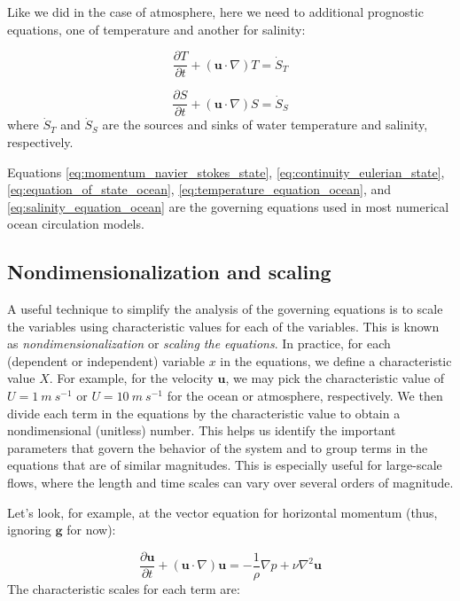\documentclass[12pt]{article}
\numberwithin{equation}{section}
\numberwithin{figure}{section}
\numberwithin{table}{section}
\begin{document}
Like we did in the case of atmosphere, here we need to additional prognostic
equations, one of temperature and another for salinity:

\begin{equation}
  \frac{\partial T}{\partial t} + (\mathbf{u} \cdot \nabla) T = \dot{S}_T
  \label{eq:temperature_equation_ocean}
\end{equation}

\begin{equation}
  \frac{\partial S}{\partial t} + (\mathbf{u} \cdot \nabla) S = \dot{S}_S
  \label{eq:salinity_equation_ocean}
\end{equation}
where $\dot{S}_T$ and $\dot{S}_S$ are the sources and sinks of water temperature
and salinity, respectively.

Equations \ref{eq:momentum_navier_stokes_state},
\ref{eq:continuity_eulerian_state},
\ref{eq:equation_of_state_ocean},
\ref{eq:temperature_equation_ocean}, and
\ref{eq:salinity_equation_ocean} are the governing equations used in most
numerical ocean circulation models.

\subsection{Nondimensionalization and scaling}
\label{sec:nondimensionalization_and_scaling}

A useful technique to simplify the analysis of the governing equations is to
scale the variables using characteristic values for each of the variables.
This is known as \textit{nondimensionalization}
or \textit{scaling the equations}.
In practice, for each (dependent or independent) variable $x$ in the equations,
we define a characteristic value $X$.
For example, for the velocity $\mathbf{u}$, we may pick the characteristic
value of $U = 1\ m\ s^{-1}$ or $U = 10\ m\ s^{-1}$ for the ocean or atmosphere,
respectively.
We then divide each term in the equations by the characteristic value to
obtain a nondimensional (unitless) number.
This helps us identify the important parameters that govern the behavior of
the system and to group terms in the equations that are of similar magnitudes.
This is especially useful for large-scale flows, where the length and time
scales can vary over several orders of magnitude.

Let's look, for example, at the vector equation for horizontal momentum
(thus, ignoring $\mathbf{g}$ for now):

\begin{equation}
  \frac{\partial \mathbf{u}}{\partial t} + (\mathbf{u} \cdot \nabla) \mathbf{u} =
  - \frac{1}{\rho} \nabla p + \nu \nabla^2 \mathbf{u}
\end{equation}
The characteristic scales for each term are:
\end{document}
